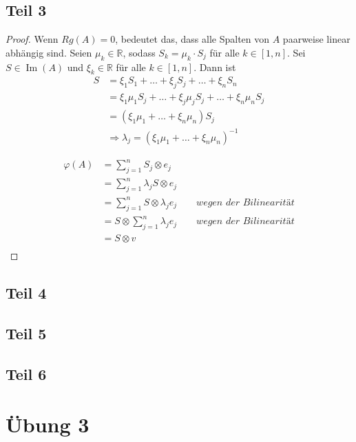 \documentclass[10pt,a4paper]{article}
\DeclareMathOperator{\Image}{Im}
\begin{document}
\subsection*{Teil 3}

\begin{proof}
Wenn $Rg(A) = 0$, bedeutet das, dass alle Spalten von $A$ paarweise linear abhängig sind.
Seien $\mu_{k} \in \mathbb{R}$, sodass $S_{k} = \mu_{k} \cdot S_{j}$ für alle $k \in [1, n]$.
Sei $S \in \Image(A)$ und $\xi_{k} \in \mathbb{R}$ für alle $k \in [1, n]$.
Dann ist
\begin{align*}
S & = \xi_{1} S_{1} + \dots + \xi_{j} S_{j} + \dots + \xi_{n} S_{n}\\
& = \xi_{1} \mu_{1} S_{j} + \dots + \xi_{j} \mu_{j} S_{j} + \dots + \xi_{n} \mu_{n} S_{j}\\
& = \left( \xi_{1} \mu_{1} + \dots + \xi_{n} \mu_{n} \right) S_{j}\\
& \Rightarrow \lambda_{j} = \left( \xi_{1} \mu_{1} + \dots + \xi_{n} \mu_{n} \right)^{-1}
\end{align*}

\begin{align*}
\varphi(A) & = \sum_{j = 1}^{n} S_{j} \otimes e_{j}\\
& = \sum_{j = 1}^{n} \lambda_{j} S \otimes e_{j}\\
& = \sum_{j = 1}^{n} S \otimes \lambda_{j} e_{j} \qquad \textit{wegen der Bilinearität}\\
& = S \otimes \sum_{j = 1}^{n} \lambda_{j} e_{j} \qquad \textit{wegen der Bilinearität}\\
& = S \otimes v\\
\end{align*}
\end{proof}

\subsection*{Teil 4}

\subsection*{Teil 5}

\subsection*{Teil 6}

\section*{Übung 3}
\end{document}
